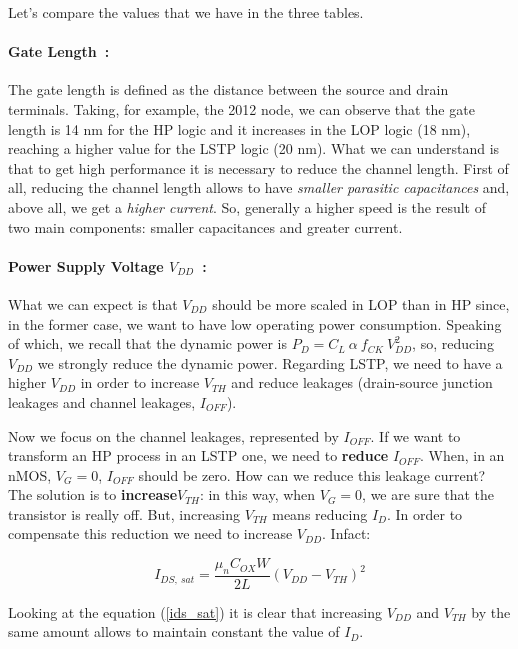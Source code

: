 \documentclass[a4paper, 12pt, twoside, openright]{report}
\begin{document}
\noindent Let's compare the values that we have in the three tables.

\paragraph{Gate Length~:} The gate length is defined as the distance between the source and drain terminals. Taking, for example, the 2012 node, we can observe that the gate length is 14 nm for the HP logic and it increases in the LOP logic (18 nm), reaching a higher value for the LSTP logic (20 nm). What we can understand is that to get high performance it is necessary to reduce the channel length. First of all, reducing the channel length allows to have \emph{smaller parasitic capacitances} and, above all, we get a \emph{higher current}. So, generally a higher speed is the result of two main components: smaller capacitances and greater current.



\paragraph{Power Supply Voltage $V_{DD}$~:} 
What we can expect is that  $V_{DD}$ should be more scaled in LOP than in HP since, in the former case, we want to have low operating power consumption. 
Speaking of which, we recall that the dynamic power is $P_{D} = C_L \ \alpha \  f_{CK} \ V_{DD}^2$, so, reducing $V_{DD}$ we strongly reduce the dynamic power. Regarding LSTP, we need to have a higher $V_{DD}$ in order to increase $V_{TH}$ and reduce leakages (drain-source junction leakages and channel leakages, $I_{OFF}$). 

Now we focus on the channel leakages, represented by $I_{OFF}$. If we want to transform an HP process in an LSTP one, we need to \textbf{reduce} $I_{OFF}$. When, in an nMOS, $V_G = 0$, $I_{OFF}$ should be zero. How can we reduce this leakage current? The solution is to \textbf{increase}$ V_{TH}$: in this way, when $V_{G} = 0$, we are sure that the transistor is really off. But, increasing $V_{TH}$ means reducing $I_{D}$. In order to compensate this reduction we need to increase $V_{DD}$. Infact:

\begin{equation}
I_{DS,\ sat} = \frac{\mu_n C_{OX} W}{2 L} (V_{DD} - V_{TH})^2
\label{ids_sat}
\end{equation}

Looking at the equation (\ref{ids_sat}) it is clear that increasing $V_{DD}$ and $V_{TH}$ by the same amount allows to maintain constant the value of $I_{D}$.
\end{document}
